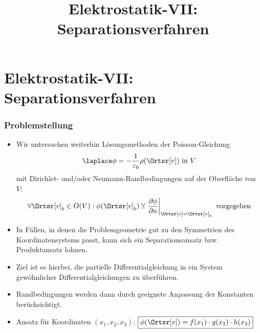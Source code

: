 

\title[TET: Elektrostatik-VII: Separationsverfahren]{Elektrostatik-VII: Separationsverfahren}


% 
% 

\maketitle

% 
% 
\section{Elektrostatik-VII: Separationsverfahren}

\begin{frame}

  \frametitle{Problemstellung}
  \begin{itemize}[<+->]
  \item Wir untersuchen weiterhin Lösungsmethoden der \alert{Poisson-Gleichung}
    $$
    \laplace \phi = -\frac{1}{\varepsilon_0} \rho(\Ortsr[v]) \text{ in } V
    $$
    mit \alert{Dirichlet-} und/oder \alert{Neumann-Randbedingungen} auf der Oberfläche von $V$:
    $$
    \forall \Ortsr[v]_{b} \in O(V) : \phi(\Ortsr[v]_b) \veebar \left. \frac{\partial \phi}{\partial n}\right|_{\Ortsr[v]=\Ortsr[v]_b} \text{ vorgegeben}
    $$
  \item In Fällen, in denen die Problemgeometrie gut zu den Symmetrien des Koordinatensystems passt, kann sich ein \alert{Separationsansatz} bzw. \alert{Produktansatz} lohnen.
  \item Ziel ist es hierbei, die partielle Differentialgleichung in ein System gewöhnlicher Differentialgleichungen zu überführen.
  \item Randbedingungen werden dann durch geeignete Anpassung der Konstanten berücksichtigt.
    \item Ansatz für Koordinaten $(x_1,x_2,x_3)$: $\boxed{\phi(\Ortsr[v])= f(x_1) \cdot g(x_2) \cdot h(x_3) }$
    \end{itemize}
  
  \end{frame}

